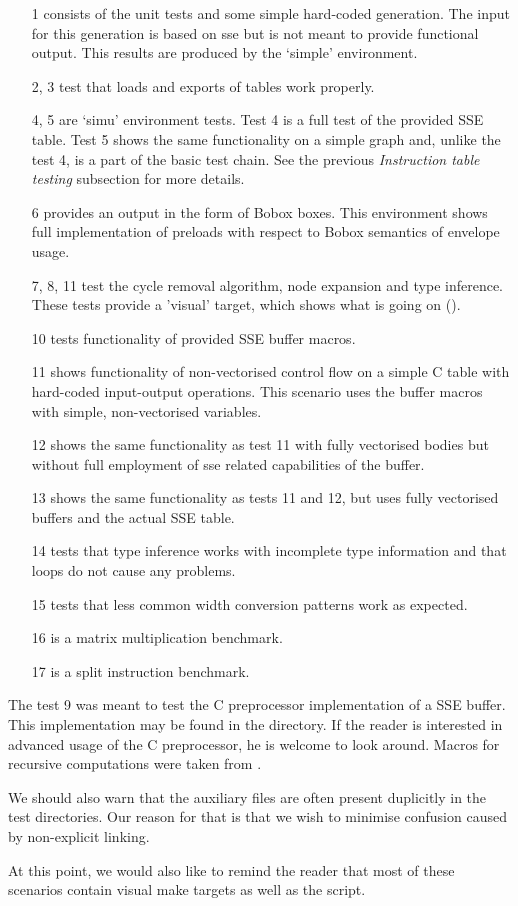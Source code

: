 \begin{enumerate}
  \item[1] consists of the unit tests and some simple hard-coded generation. The input for this generation is based on sse but is not meant to provide functional output. This results are produced by the `simple' environment.
  \item[2, 3] test that loads and exports of tables work properly.
  \item[4, 5] are `simu' environment tests. Test 4 is a full test of the provided SSE table. Test 5 shows the same functionality on a simple graph and, unlike the test 4, is a part of the basic test chain. See the previous \emph{Instruction table testing} subsection for more details.
  \item[6] provides an output in the form of Bobox boxes. This environment shows full implementation of preloads with respect to Bobox semantics of envelope usage.
  \item[7, 8, 11] test the cycle removal algorithm, node expansion and type inference. These tests provide a 'visual' target, which shows what is going on ().
  \item[10] tests functionality of provided SSE buffer macros.
  \item[11] shows functionality of non-vectorised control flow on a simple C table with hard-coded input-output operations. This scenario uses the buffer macros with simple, non-vectorised variables.
  \item[12] shows the same functionality as test 11 with fully vectorised bodies but without full employment of sse related capabilities of the buffer.
  \item[13] shows the same functionality as tests 11 and 12, but uses fully vectorised buffers and the actual SSE table.
  \item[14] tests that type inference works with incomplete type information and that loops do not cause any problems.
  \item[15] tests that less common width conversion patterns work as expected.
  \item[16] is a matrix multiplication benchmark.
  \item[17] is a split instruction benchmark.
\end{enumerate}

The test 9 was meant to test the C preprocessor implementation of a SSE buffer. This implementation may be found in the  directory. If the reader is interested in advanced usage of the C preprocessor, he is welcome to look around. Macros for recursive computations were taken from \cite{cloak}.

We should also warn that the auxiliary files are often present duplicitly in the test directories. Our reason for that is that we wish to minimise confusion caused by non-explicit linking.

At this point, we would also like to remind the reader that most of these scenarios contain visual make targets as well as the  script. 
